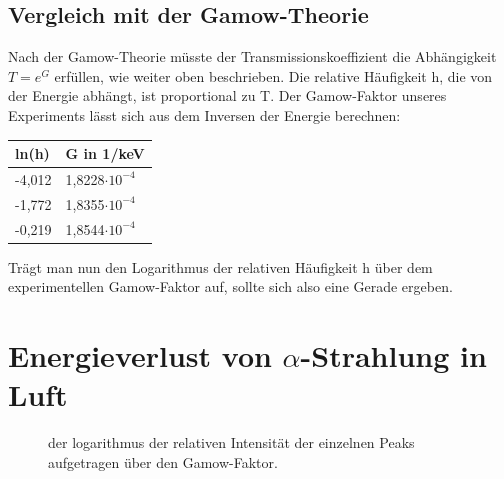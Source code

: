\documentclass[bigchapter,colorback,accentcolor=tud4b,linedtoc,11pt]{tudreport}
\begin{document}
\subsection{Vergleich mit der Gamow-Theorie}
Nach der Gamow-Theorie müsste der Transmissionskoeffizient die Abhängigkeit $T = e^G$ erfüllen, wie weiter oben beschrieben. Die relative Häufigkeit h, die von der Energie abhängt, ist proportional zu T. Der Gamow-Faktor unseres Experiments lässt sich aus dem Inversen der Energie berechnen:

\begin{center}
  \begin{tabular}{|p{4cm}|p{5cm}|}
    \hline
    ln(h)  & G in 1/keV            \\ \hline
    -4,012 & 1,8228$\cdot 10^{-4}$ \\ \hline
    -1,772 & 1,8355$\cdot 10^{-4}$ \\ \hline
    -0,219 & 1,8544$\cdot 10^{-4}$ \\ \hline
    \end{tabular}
\end{center}

Trägt man nun den Logarithmus der relativen Häufigkeit h über dem experimentellen Gamow-Faktor auf, sollte sich also eine Gerade ergeben.


\section{Energieverlust von $\alpha$-Strahlung in Luft}
\begin{figure}[H]
    \caption{der logarithmus der relativen Intensität der einzelnen Peaks
      aufgetragen über den Gamow-Faktor.}
\end{figure}
\end{document}
